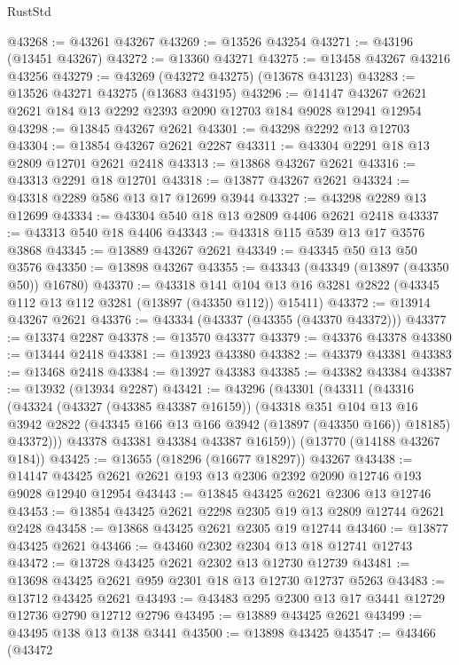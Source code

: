 \begin{lexlean}{RustStd}
\begin{coremodule}
@43268 := @43261 @43267
@43269 := @13526 @43254
@43271 := @43196 (@13451 @43267)
@43272 := @13360 @43271
@43275 := @13458 @43267 @43216 @43256
@43279 := @43269 (@43272 @43275) (@13678 @43123)
@43283 := @13526 @43271 @43275 (@13683 @43195)
@43296 := @14147 @43267 @2621 @2621 @184 @13 @2292 @2393 @2090 @12703 @184 @9028 @12941 @12954
@43298 := @13845 @43267 @2621
@43301 := @43298 @2292 @13 @12703
@43304 := @13854 @43267 @2621 @2287
@43311 := @43304 @2291 @18 @13 @2809 @12701 @2621 @2418
@43313 := @13868 @43267 @2621
@43316 := @43313 @2291 @18 @12701
@43318 := @13877 @43267 @2621
@43324 := @43318 @2289 @586 @13 @17 @12699 @3944
@43327 := @43298 @2289 @13 @12699
@43334 := @43304 @540 @18 @13 @2809 @4406 @2621 @2418
@43337 := @43313 @540 @18 @4406
@43343 := @43318 @115 @539 @13 @17 @3576 @3868
@43345 := @13889 @43267 @2621
@43349 := @43345 @50 @13 @50 @3576
@43350 := @13898 @43267
@43355 := @43343 (@43349 (@13897 (@43350 @50)) @16780)
@43370 := @43318
    @141
    @104
    @13
    @16
    @3281
    @2822
    (@43345 @112 @13 @112 @3281 (@13897 (@43350 @112)) @15411)
@43372 := @13914 @43267 @2621
@43376 := @43334 (@43337 (@43355 (@43370 @43372)))
@43377 := @13374 @2287
@43378 := @13570 @43377
@43379 := @43376 @43378
@43380 := @13444 @2418
@43381 := @13923 @43380
@43382 := @43379 @43381
@43383 := @13468 @2418
@43384 := @13927 @43383
@43385 := @43382 @43384
@43387 := @13932 (@13934 @2287)
@43421 := @43296
    (@43301
      (@43311
        (@43316
          (@43324
            (@43327 (@43385 @43387 @16159))
            (@43318
              @351
              @104
              @13
              @16
              @3942
              @2822
              (@43345 @166 @13 @166 @3942 (@13897 (@43350 @166)) @18185)
              @43372)))
        @43378
        @43381
        @43384
        @43387
        @16159))
    (@13770 (@14188 @43267 @184))
@43425 := @13655 (@18296 (@16677 @18297)) @43267
@43438 := @14147 @43425 @2621 @2621 @193 @13 @2306 @2392 @2090 @12746 @193 @9028 @12940 @12954
@43443 := @13845 @43425 @2621 @2306 @13 @12746
@43453 := @13854 @43425 @2621 @2298 @2305 @19 @13 @2809 @12744 @2621 @2428
@43458 := @13868 @43425 @2621 @2305 @19 @12744
@43460 := @13877 @43425 @2621
@43466 := @43460 @2302 @2304 @13 @18 @12741 @12743
@43472 := @13728 @43425 @2621 @2302 @13 @12730 @12739
@43481 := @13698 @43425 @2621 @959 @2301 @18 @13 @12730 @12737 @5263
@43483 := @13712 @43425 @2621
@43493 := @43483 @295 @2300 @13 @17 @3441 @12729 @12736 @2790 @12712 @2796
@43495 := @13889 @43425 @2621
@43499 := @43495 @138 @13 @138 @3441
@43500 := @13898 @43425
@43547 := @43466
    (@43472

\end{coremodule}
\end{lexlean}
